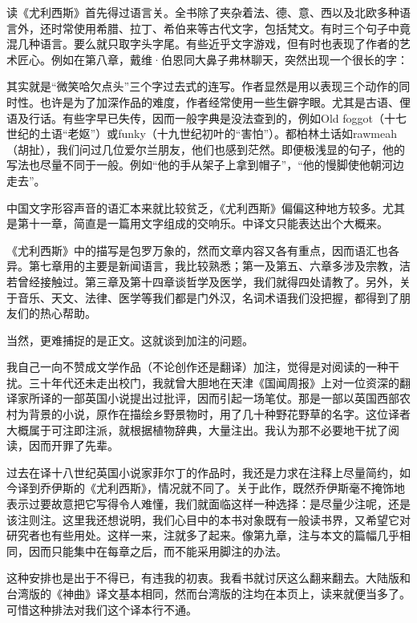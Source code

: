 \par 读《尤利西斯》首先得过语言关。全书除了夹杂着法、德、意、西以及北欧多种语言外，还时常使用希腊、拉丁、希伯来等古代文字，包括梵文。有时三个句子中竟混几种语言。要么就只取字头字尾。有些近乎文字游戏，但有时也表现了作者的艺术匠心。例如在第八章，戴维·伯恩同大鼻子弗林聊天，突然出现一个很长的字：
\par 其实就是“微笑哈欠点头”三个字过去式的连写。作者显然是用以表现三个动作的同时性。也许是为了加深作品的难度，作者经常使用一些生僻字眼。尤其是古语、俚语及行话。有些字早已失传，因而一般字典是没法查到的，例如Old foggot（十七世纪的土语“老妪”）或funky（十九世纪初叶的“害怕”）。都柏林土话如rawmeah（胡扯），我们问过几位爱尔兰朋友，他们也感到茫然。即便极浅显的句子，他的写法也尽量不同于一般。例如“他的手从架子上拿到帽子”，“他的慢脚使他朝河边走去”。
\par 中国文字形容声音的语汇本来就比较贫乏，《尤利西斯》偏偏这种地方较多。尤其是第十一章，简直是一篇用文字组成的交响乐。中译文只能表达出个大概来。
\par 《尤利西斯》中的描写是包罗万象的，然而文章内容又各有重点，因而语汇也各异。第七章用的主要是新闻语言，我比较熟悉；第一及第五、六章多涉及宗教，洁若曾经接触过。第三章及第十四章谈哲学及医学，我们就得四处请教了。另外，关于音乐、天文、法律、医学等我们都是门外汉，名词术语我们没把握，都得到了朋友们的热心帮助。
\par 当然，更难捕捉的是正文。这就谈到加注的问题。
\par 我自己一向不赞成文学作品（不论创作还是翻译）加注，觉得是对阅读的一种干扰。三十年代还未走出校门，我就曾大胆地在天津《国闻周报》上对一位资深的翻译家所译的一部英国小说提出过批评，因而引起一场笔仗。那是一部以英国西部农村为背景的小说，原作在描绘乡野景物时，用了几十种野花野草的名字。这位译者大概属于可注即注派，就根据植物辞典，大量注出。我认为那不必要地干扰了阅读，因而开罪了先辈。
\par 过去在译十八世纪英国小说家菲尔丁的作品时，我还是力求在注释上尽量简约，如今译到乔伊斯的《尤利西斯》，情况就不同了。关于此作，既然乔伊斯毫不掩饰地表示过要故意把它写得令人难懂，我们就面临这样一种选择：是尽量少注呢，还是该注则注。这里我还想说明，我们心目中的本书对象既有一般读书界，又希望它对研究者也有些用处。这样一来，注就多了起来。像第九章，注与本文的篇幅几乎相同，因而只能集中在每章之后，而不能采用脚注的办法。
\par 这种安排也是出于不得已，有违我的初衷。我看书就讨厌这么翻来翻去。大陆版和台湾版的《神曲》译文基本相同，然而台湾版的注均在本页上，读来就便当多了。可惜这种排法对我们这个译本行不通。
